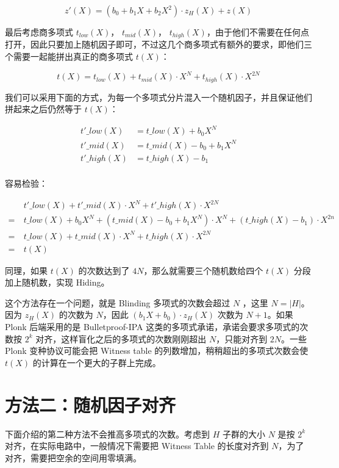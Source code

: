 \[
z'(X) = (b_0 + b_1X+ b_2X^2)\cdot z_H(X) + z(X)
\]

最后考虑商多项式 \(t_{low}(X)\)， \(t_{mid}(X)\)，
\(t_{high}(X)\)，由于他们不需要在任何点打开，因此只要加上随机因子即可，不过这几个商多项式有额外的要求，即他们三个需要一起能拼出真正的商多项式
\(t(X)\)：

\[
t(X) = t_{low}(X) + t_{mid}(X)\cdot X^N + t_{high}(X)\cdot X^{2N}
\]

我们可以采用下面的方式，为每一个多项式分片混入一个随机因子，并且保证他们拼起来之后仍然等于
\(t(X)\)：

\[
\begin{split}
t'\_{low}(X)&=t\_{low}(X) + b_0X^N\\
t'\_{mid}(X)&=t\_{mid}(X) - b_0 + b_1X^N\\
t'\_{high}(X)&=t\_{high}(X) - b_1\\
\end{split}
\]

容易检验：

\[
\begin{split}
&t'\_{low}(X) + t'\_{mid}(X)\cdot X^N + t'\_{high}(X)\cdot X^{2N} \\
=\ &  t\_{low}(X) + b_0X^N + (t\_{mid}(X) - b_0 + b_1X^N)\cdot X^N + (t\_{high}(X) - b_1)\cdot X^{2n} \\
=\ & t\_{low}(X) + t\_{mid}(X)\cdot X^N + t\_{high}(X)\cdot X^{2N} \\
=\ & t(X)
\end{split}
\]

同理，如果 \(t(X)\) 的次数达到了 \(4N\)，那么就需要三个随机数给四个
\(t(X)\) 分段加上随机数，实现 Hiding。

这个方法存在一个问题，就是 Blinding 多项式的次数会超过 \(N\) ，这里
\(N=|H|\)。因为 \(z_H(X)\) 的次数为 \(N\)，因此
\((b_1 X + b_0)\cdot z_H(X)\) 次数为 \(N+1\)。如果 Plonk 后端采用的是
Bulletproof-IPA 这类的多项式承诺，承诺会要求多项式的次数按 \(2^k\)
对齐，这样盲化之后的多项式的次数刚刚超出 \(N\)，只能对齐到 \(2N\)。一些
Plonk 变种协议可能会把 Witness table
的列数增加，稍稍超出的多项式次数会使 \(t(X)\)
的计算在一个更大的子群上完成。

\hypertarget{ux65b9ux6cd5ux4e8cux968fux673aux56e0ux5b50ux5bf9ux9f50}{%
\section{方法二：随机因子对齐}\label{ux65b9ux6cd5ux4e8cux968fux673aux56e0ux5b50ux5bf9ux9f50}}

下面介绍的第二种方法不会推高多项式的次数。考虑到 \(H\) 子群的大小 \(N\)
是按 \(2^k\) 对齐，在实际电路中，一般情况下需要把 Witness Table
的长度对齐到 \(N\)，为了对齐，需要把空余的空间用零填满。

